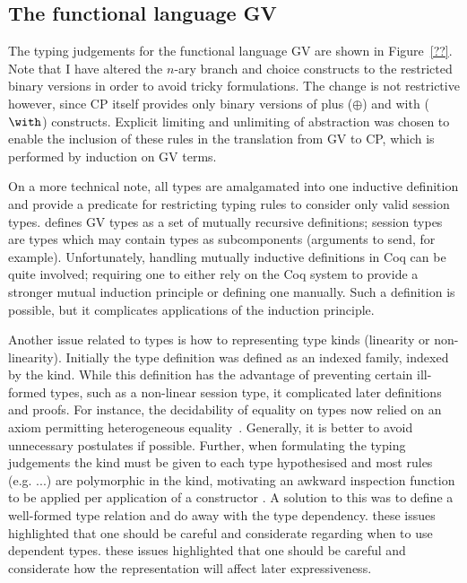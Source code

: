 \subsection{The functional language GV}\label{sec:gv}



The typing judgements for the functional language GV are shown in
Figure~\ref{??}. Note that I have altered the $n$-ary branch and choice
constructs to the restricted binary versions in order to avoid tricky
formulations. The change is not restrictive however, since CP itself provides
only binary versions of plus ($\oplus$) and with ($\with$)
constructs. Explicit limiting and unlimiting of abstraction was chosen to
enable the inclusion of these rules in the translation from GV to CP, which is
performed by induction on GV terms.

On a more technical note, all types are amalgamated into one inductive
definition and provide a predicate for restricting typing rules to consider
only valid session types. \citeauthor{Wadler:2014} defines GV types as a set
of mutually recursive definitions; session types are types which may contain
types as subcomponents (arguments to send, for example). Unfortunately,
handling mutually inductive definitions in Coq can be quite involved;
requiring one to either rely on the Coq system to provide a stronger mutual
induction principle or defining one manually. Such a definition is possible,
but it complicates applications of the induction principle.

Another issue related to types is how to representing type kinds (linearity or
non-linearity). Initially the type definition was defined as an indexed
family, indexed by the kind. While this definition has the advantage of
preventing certain ill-formed types, such as a non-linear session type, it
complicated later definitions and proofs. For instance, the decidability of
equality on types now relied on an axiom permitting heterogeneous
equality~\cite{??}. Generally, it is better to avoid unnecessary postulates if
possible. Further, when formulating the typing judgements the kind must be
given to each type hypothesised and most rules (e.g. ...) are polymorphic in
the kind, motivating an awkward inspection function to be applied per
application of a constructor . A solution to
this was to define a well-formed type relation and do away with the type
dependency. these issues highlighted that one should be careful and
considerate regarding when to use dependent types. these issues highlighted
that one should be careful and considerate how the representation will affect
later expressiveness.


